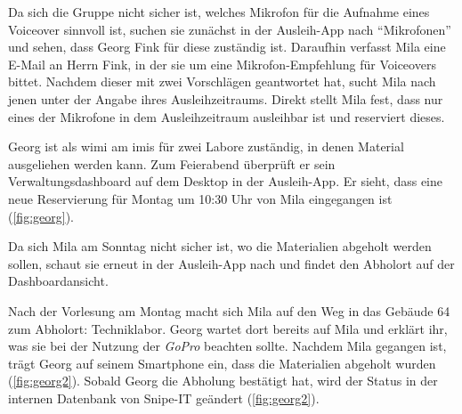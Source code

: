 Da sich die Gruppe nicht sicher ist, welches Mikrofon für die Aufnahme eines
Voiceover sinnvoll ist, suchen sie zunächst in der Ausleih-App nach \enquote{Mikrofonen} und
sehen, dass Georg Fink für diese zuständig ist. Daraufhin verfasst Mila eine
E-Mail an Herrn Fink, in der sie um eine Mikrofon-Empfehlung für Voiceovers
bittet. Nachdem dieser mit zwei Vorschlägen geantwortet hat, sucht Mila nach
jenen unter der Angabe ihres Ausleihzeitraums. Direkt stellt Mila fest, dass
nur eines der Mikrofone in dem Ausleihzeitraum ausleihbar ist und reserviert
dieses.

Georg ist als \ac{wimi} am \ac{imis} für zwei Labore zuständig, in
denen Material ausgeliehen werden kann. Zum Feierabend überprüft er sein
Verwaltungsdashboard auf dem Desktop in der Ausleih-App. Er sieht, dass eine neue
Reservierung für Montag um 10:30 Uhr von Mila eingegangen ist (\ref{fig:georg}).

Da sich Mila am Sonntag nicht sicher ist, wo die Materialien abgeholt werden
sollen, schaut sie erneut in der Ausleih-App nach und findet den Abholort auf
der Dashboardansicht.

Nach der Vorlesung am Montag macht sich Mila auf den Weg in das Gebäude 64 zum
Abholort: Techniklabor. Georg wartet dort bereits auf Mila und erklärt ihr, was
sie bei der Nutzung der \textit{GoPro} beachten sollte. Nachdem Mila gegangen ist, trägt
Georg auf seinem Smartphone ein, dass die Materialien abgeholt wurden (\ref{fig:georg2}). Sobald
Georg die Abholung bestätigt hat, wird der Status in der internen Datenbank von
Snipe-IT geändert (\ref{fig:georg2}).

